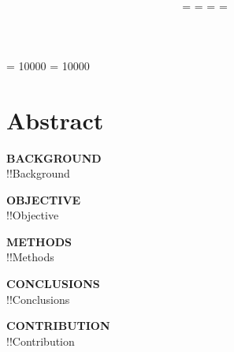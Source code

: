 \documentclass[10pt,twoside,reqno]{article}
\begin{document}
\widowpenalty = 10000
\clubpenalty = 10000

\setlength{\parskip}{0ex}
\setlength{\parindent}{.7cm}
\setlength{\bibsep}{.18cm}
\setlength{\belowdisplayskip}{15pt} \setlength{\belowdisplayshortskip}{10pt}
\setlength{\abovedisplayskip}{15pt} \setlength{\abovedisplayshortskip}{10pt}


\title{\textbf{\drtitleone}\vspace{5mm}}
\author{
=\autorzahl
	\autorenitit
\else
	=\autorzahl
		\autoreniitit
	\else
		=\autorzahl
			\autoreniiitit
		\else
			=\autorzahl
				\expandafter\autorenivtit
			\else
				\autorenvtit
			\fi
		\fi
	\fi
\fi
}

\makecover
\newpage
\pagestyle{empty}
\renewcommand{\contentsname}{Contents}
{\footnotesize \tableofcontents}
\newpage



\setcounter{page}{\drstartpage}							
\maketitle
\thispagestyle{plain}


\vspace*{-24pt}
\vspace*{5mm}
\setlength{\parskip}{0.5em}
\section*{Abstract}


\noindent\textbf{BACKGROUND}\\
!!Background
\par
\noindent\textbf{OBJECTIVE}\\
!!Objective
\par
\noindent\textbf{METHODS}\\
!!Methods
\par
\noindent\textbf{CONCLUSIONS}\\
!!Conclusions
\par
\noindent\textbf{CONTRIBUTION}\\
!!Contribution
 
\end{document}
